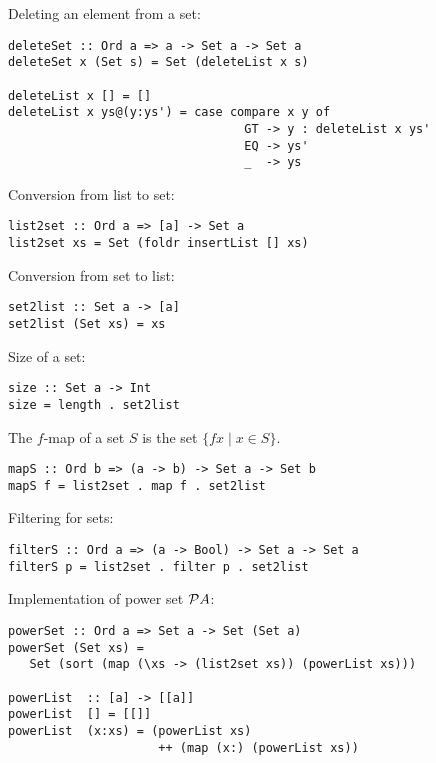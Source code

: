 Deleting an element from a set: 

\bc\begin{verbatim}
deleteSet :: Ord a => a -> Set a -> Set a 
deleteSet x (Set s) = Set (deleteList x s)

deleteList x [] = []
deleteList x ys@(y:ys') = case compare x y of 
                                 GT -> y : deleteList x ys'
                                 EQ -> ys'
                                 _  -> ys
\end{verbatim}\ec

Conversion from list to set: 

\bc\begin{verbatim}
list2set :: Ord a => [a] -> Set a
list2set xs = Set (foldr insertList [] xs)
\end{verbatim}\ec

Conversion from set to list: 

\bc\begin{verbatim}
set2list :: Set a -> [a] 
set2list (Set xs) = xs
\end{verbatim}\ec

Size of a set: 

\bc\begin{verbatim} 
size :: Set a -> Int
size = length . set2list
\end{verbatim}\ec

The $f$-map of a set $S$  is the set $\{ f x \mid x \in S \}$. 

\bc\begin{verbatim} 
mapS :: Ord b => (a -> b) -> Set a -> Set b
mapS f = list2set . map f . set2list
\end{verbatim}\ec

Filtering for sets: 

\bc\begin{verbatim} 
filterS :: Ord a => (a -> Bool) -> Set a -> Set a
filterS p = list2set . filter p . set2list
\end{verbatim}\ec

Implementation of power set ${\cal P} A$: 

\bc\begin{verbatim}
powerSet :: Ord a => Set a -> Set (Set a)
powerSet (Set xs) = 
   Set (sort (map (\xs -> (list2set xs)) (powerList xs)))

powerList  :: [a] -> [[a]]
powerList  [] = [[]]
powerList  (x:xs) = (powerList xs) 
                     ++ (map (x:) (powerList xs))
\end{verbatim}\ec

